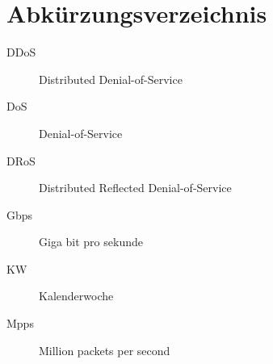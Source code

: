 \documentclass[../review_2.tex]{subfiles}
\begin{document}
\chapter*{Abkürzungsverzeichnis}\thispagestyle{plain}
\begin{description}
    \item[DDoS] Distributed Denial-of-Service
    \item[DoS] Denial-of-Service
    \item[DRoS] Distributed Reflected Denial-of-Service
    \item[Gbps] Giga bit pro sekunde
    \item[KW] Kalenderwoche
    \item[Mpps] Million packets per second
\end{description}
\end{document}

